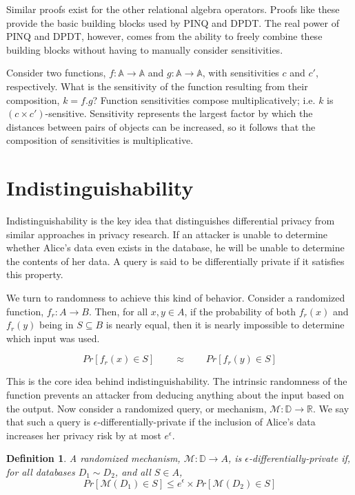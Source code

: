\documentclass[12pt]{report}
\newtheorem{defn}{Definition}[section]
\begin{document}
Similar proofs exist for the other relational algebra operators.
Proofs like these provide the basic building blocks used by PINQ and DPDT.
The real power of PINQ and DPDT, however, comes from the ability to freely combine these building blocks without having to manually consider sensitivities.

Consider two functions, $f : \mathbb A \rightarrow \mathbb A$ and $g : \mathbb A \rightarrow \mathbb A$, with sensitivities $c$ and $c'$, respectively.
What is the sensitivity of the function resulting from their composition, $k = f . g$?
Function sensitivities compose multiplicatively; i.e. $k$ is $(c\times c')$-sensitive.
Sensitivity represents the largest factor by which the distances between pairs of objects can be increased, so it follows that the composition of sensitivities is multiplicative.

\section{Indistinguishability}

Indistinguishability is the key idea that distinguishes differential privacy from similar approaches in privacy research.
If an attacker is unable to determine whether Alice's data even exists in the database, he will be unable to determine the contents of her data.
A query is said to be differentially private if it satisfies this property.

We turn to randomness to achieve this kind of behavior.
Consider a randomized function, $f_r : A \rightarrow B$.
Then, for all $x,y \in A$, if the probability of both $f_r(x)$ and $f_r(y)$ being in $S \subseteq B$ is nearly equal, then it is nearly impossible to determine which input was used.

$$ Pr[f_r(x)\in S] \qquad\approx\qquad  Pr[f_r(y)\in S] $$

This is the core idea behind indistinguishability.
The intrinsic randomness of the function prevents an attacker from deducing anything about the input based on the output.
Now consider a randomized query, or mechanism, $\mathcal M : \mathbb D \rightarrow \mathbb R$.
We say that such a query is $\epsilon$-differentially-private if the inclusion of Alice's data increases her privacy risk by at most $e^\epsilon$.

\begin{defn}\label{def:diffpriv}
  A randomized mechanism, $\mathcal{M} : \mathbb D \rightarrow A$, is $\epsilon$-differentially-private if, for all databases $D_1 \sim D_2$, and all $S \in A$,
  $$Pr[\mathcal M(D_1)\in S] \le e^\epsilon \times Pr[\mathcal M(D_2)\in S]$$
\end{defn}
\end{document}
